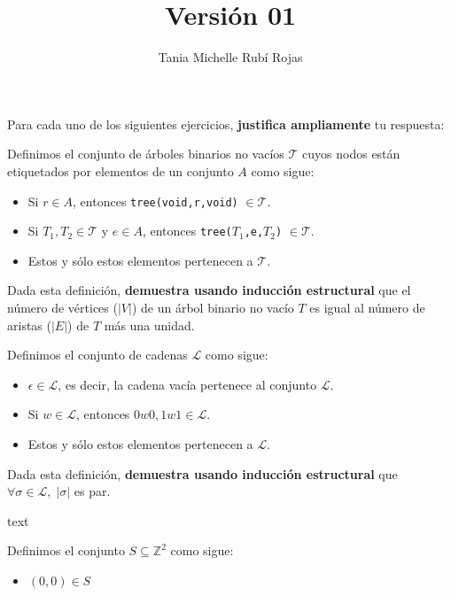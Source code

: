 \documentclass[oneside]{style}
\title{Versión 01}
\author{Tania Michelle Rubí Rojas}
\begin{document}
\maketitle

Para cada uno de los siguientes ejercicios, \textbf{justifica ampliamente} tu 
respuesta:

\begin{questions}[label=\protect\circled{\bfseries\arabic*}]
    \question
    {
        Definimos el conjunto de árboles binarios no vacíos $\mathcal{T}$ 
        cuyos nodos están etiquetados por elementos de un conjunto $A$
        como sigue:
        \begin{itemize}
            \item Si $r \in A$, entonces \texttt{tree(void,r,void)} $\in 
            \mathcal{T}$.

            \item Si $T_1, T_2 \in \mathcal{T}$ y $e \in A$, entonces 
            \texttt{tree($T_1$,e,$T_2$)} $\in \mathcal{T}$.

            \item Estos y sólo estos elementos pertenecen a $\mathcal{T}$. 
        \end{itemize}

        Dada esta definición, \textbf{demuestra usando inducción estructural} 
        que el número de vértices ($|V|$) de un árbol binario no vacío $T$ es 
        igual al número de aristas ($|E|$) de $T$ más una unidad. 
    }

    \question
    {
        Definimos el conjunto de cadenas $\mathcal{L}$ como sigue:
        \begin{itemize}
            \item $\epsilon \in \mathcal{L}$, es decir, la cadena vacía 
            pertenece al conjunto $\mathcal{L}$. 
            
            \item Si $w \in \mathcal{L}$, entonces $0w0, 1w1 \in \mathcal{L}$.
            
            \item Estos y sólo estos elementos pertenecen a $\mathcal{L}$. 
        \end{itemize}

        Dada esta definición, \textbf{demuestra usando inducción estructural}
        que $\forall \sigma \in \mathcal{L}, \; |\sigma|$ es par. 
    }text

    \question
    {
        Definimos el conjunto $S \subseteq \mathbb{Z}^2$ como sigue:
        \begin{itemize}
            \item $(0,0) \in S$ 


\end{itemize}}
\end{questions}
\end{document}
